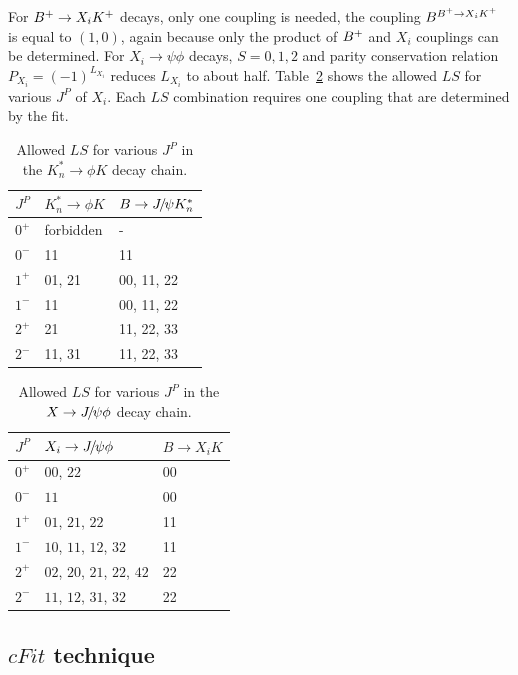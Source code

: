 For ${{{B}^+}}\rightarrow X_i {{K}^+}$ decays, 
only one coupling is needed, 
the coupling $B^{{{{B}^+}}\rightarrow X_i {{K}^+}}$ is equal to $(1,0)$, 
again because only the product of ${{{B}^+}}$ and $X_i$ couplings can be determined.  
For $X_i\to \psi \phi$ decays, $S=0,1,2$ and parity conservation relation $P_{X_i}=(-1)^{L_{X_i}}$  reduces $L_{X_i}$ to about half. 
Table~\ref{tab:XLS} shows the allowed $LS$ for various $J^P$ of $X_i$. 
Each $LS$ combination requires one coupling that are determined by the fit.


\begin{table}[!hbtp]
\caption{Allowed $LS$ for various $J^P$ in the $K^*_n \to \phi K$ decay chain.}\label{tab:KLS}
\centering
\begin{tabular}{c|l|l}
$J^P$& $K^*_n \to \phi K$ & $B\rightarrow {\ensuremath{{J\mskip -3mu/\mskip -2mu\psi}}} K_n^*$ \\\hline
$0^+$& forbidden&-\\
$0^-$& 11 &11\\
$1^+$& 01, 21 &00, 11, 22\\
$1^-$ & 11 &00, 11, 22\\
$2^+$ & 21 &11, 22, 33\\
$2^-$ & 11, 31 &11, 22, 33\\
\end{tabular}
\end{table}

\begin{table}[!hbtp]
\caption{Allowed $LS$ for various $J^P$ in the $X\rightarrow{\ensuremath{{J\mskip -3mu/\mskip -2mu\psi}}} \phi$ decay chain.}\label{tab:XLS}
\centering
\begin{tabular}{c|l|l}
$J^P$& $X_i\rightarrow {\ensuremath{{J\mskip -3mu/\mskip -2mu\psi}}} \phi$& $B\to X_i K$ \\\hline
$0^+$& $00$, $22$&00\\
$0^-$& $11$&00\\
$1^+$& $01$, $21$, $22$&11\\
$1^-$ & $10$, $11$, $12$, $32$&11\\
$2^+$ & $02$, $20$, $21$, $22$, $42$&22\\
$2^-$ & $11$, $12$, $31$, $32$&22\\
\end{tabular}
\end{table}






\subsection{$cFit$ technique}

